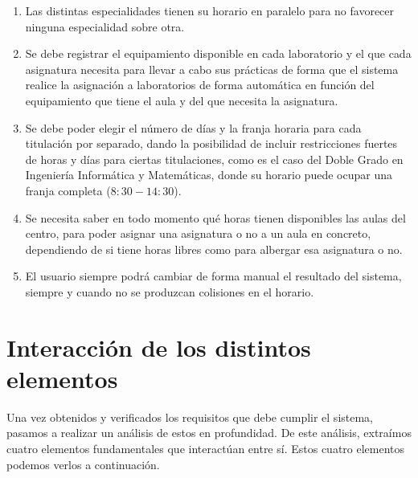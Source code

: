 \begin{enumerate}[REQ-1]
    \item Las distintas especialidades tienen su horario en paralelo para no favorecer ninguna especialidad sobre otra. 
    \item Se debe registrar el equipamiento disponible en cada laboratorio y el que cada asignatura necesita para llevar a cabo sus prácticas de forma que el sistema realice la asignación a laboratorios de forma automática en función del equipamiento que tiene el aula y del que necesita la asignatura. 
    \item Se debe poder elegir el número de días y la franja horaria para cada titulación por separado, dando la posibilidad de incluir restricciones fuertes de horas y días para ciertas titulaciones, como es el caso del Doble Grado en Ingeniería Informática y Matemáticas, donde su horario puede ocupar una franja completa ($8:30-14:30$).
    \item Se necesita saber en todo momento qué horas tienen disponibles las aulas del centro, para poder asignar una asignatura o no a un aula en concreto, dependiendo de si tiene horas libres como para albergar esa asignatura o no.
    \item El usuario siempre podrá cambiar de forma manual el resultado del sistema, siempre y cuando no se produzcan colisiones en el horario.
\end{enumerate}

\section{Interacción de los distintos elementos}

Una vez obtenidos y verificados los requisitos que debe cumplir el sistema, pasamos a realizar un análisis de estos en profundidad. De este análisis, extraímos cuatro elementos fundamentales que interactúan entre sí. Estos cuatro elementos podemos verlos a continuación.


